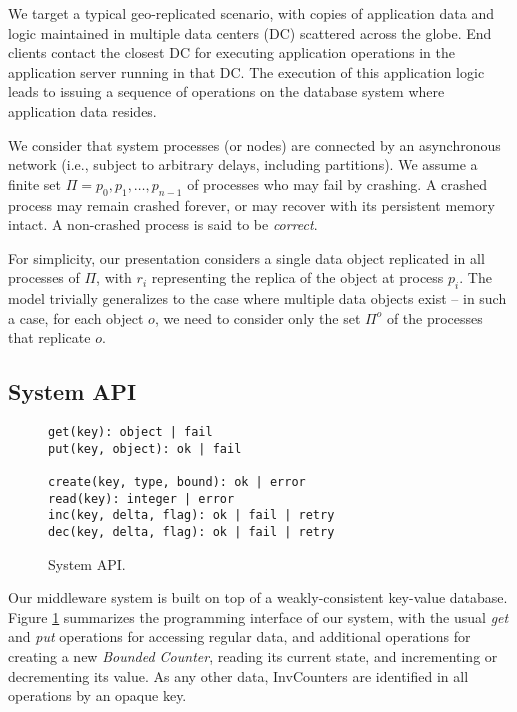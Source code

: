 \documentclass[conference]{IEEEtran}
\newcommand{\InvCounter}{\emph{Bounded Counter}}
\begin{document}
We target a typical geo-replicated scenario, with copies of application data and logic 
maintained in multiple data centers (DC) scattered across the globe.
End clients contact the closest DC for executing application operations in 
the application server running in that DC. 
The execution of this application logic leads to issuing a sequence of operations 
on the database system where application data resides. 

We consider that system processes
(or nodes) are connected by an asynchronous network (i.e., subject to arbitrary
delays, including partitions).
We assume a finite set $\Pi = {p_0, p_1, \ldots,p_{n-1}}$ of processes who may fail by crashing.
A crashed process may remain crashed forever, or may recover with its persistent memory intact.
A non-crashed process is said to be {\em correct}.

For simplicity, our presentation considers a single data object replicated in all 
processes of $\Pi$, with $r_i$ representing the replica of the object at process $p_i$.
The model trivially generalizes to the case where multiple data objects exist -- in 
such a case, for each object $o$, we need to consider only the set $\Pi^{o}$ of the processes that replicate $o$.




\subsection{System API}

\begin{figure}[t] 
{\footnotesize \centering
\begin{verbatim}
get(key): object | fail
put(key, object): ok | fail

create(key, type, bound): ok | error
read(key): integer | error
inc(key, delta, flag): ok | fail | retry
dec(key, delta, flag): ok | fail | retry 
\end{verbatim}
\vspace{-2ex}
}
\caption{System API.}
\label{fig:API}
\vspace{-2ex}
\end{figure}

Our middleware system is built on top of a weakly-consistent key-value database. 
Figure \ref{fig:API} summarizes the programming interface of our system, with the
usual \emph{get} and \emph{put} operations for accessing regular data, and additional
operations for creating a new \InvCounter{}, reading its current state, and incrementing 
or decrementing its value.
As any other data, InvCounters{} are identified in all operations by an 
opaque key.
\end{document}
